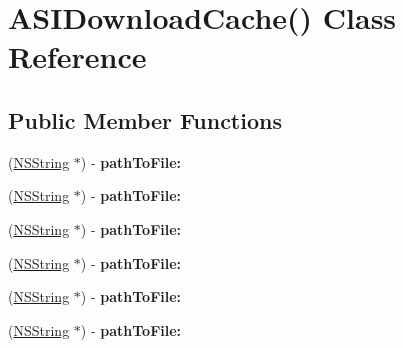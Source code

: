 \hypertarget{interface_a_s_i_download_cache_07_08}{
\section{\-A\-S\-I\-Download\-Cache() \-Class \-Reference}
\label{interface_a_s_i_download_cache_07_08}
}
\subsection*{\-Public \-Member \-Functions}
\begin{DoxyCompactItemize}
\item 
\hypertarget{interface_a_s_i_download_cache_07_08_a3a4f13706864d9965b66fa702d4e9de6}{
(\hyperlink{class_n_s_string}{\-N\-S\-String} $\ast$) -\/ {\bfseries path\-To\-File\-:}}
\label{interface_a_s_i_download_cache_07_08_a3a4f13706864d9965b66fa702d4e9de6}

\item 
\hypertarget{interface_a_s_i_download_cache_07_08_a3a4f13706864d9965b66fa702d4e9de6}{
(\hyperlink{class_n_s_string}{\-N\-S\-String} $\ast$) -\/ {\bfseries path\-To\-File\-:}}
\label{interface_a_s_i_download_cache_07_08_a3a4f13706864d9965b66fa702d4e9de6}

\item 
\hypertarget{interface_a_s_i_download_cache_07_08_a3a4f13706864d9965b66fa702d4e9de6}{
(\hyperlink{class_n_s_string}{\-N\-S\-String} $\ast$) -\/ {\bfseries path\-To\-File\-:}}
\label{interface_a_s_i_download_cache_07_08_a3a4f13706864d9965b66fa702d4e9de6}

\item 
\hypertarget{interface_a_s_i_download_cache_07_08_a3a4f13706864d9965b66fa702d4e9de6}{
(\hyperlink{class_n_s_string}{\-N\-S\-String} $\ast$) -\/ {\bfseries path\-To\-File\-:}}
\label{interface_a_s_i_download_cache_07_08_a3a4f13706864d9965b66fa702d4e9de6}

\item 
\hypertarget{interface_a_s_i_download_cache_07_08_a3a4f13706864d9965b66fa702d4e9de6}{
(\hyperlink{class_n_s_string}{\-N\-S\-String} $\ast$) -\/ {\bfseries path\-To\-File\-:}}
\label{interface_a_s_i_download_cache_07_08_a3a4f13706864d9965b66fa702d4e9de6}

\item 
\hypertarget{interface_a_s_i_download_cache_07_08_a3a4f13706864d9965b66fa702d4e9de6}{
(\hyperlink{class_n_s_string}{\-N\-S\-String} $\ast$) -\/ {\bfseries path\-To\-File\-:}}
\label{interface_a_s_i_download_cache_07_08_a3a4f13706864d9965b66fa702d4e9de6}


\end{DoxyCompactItemize}
